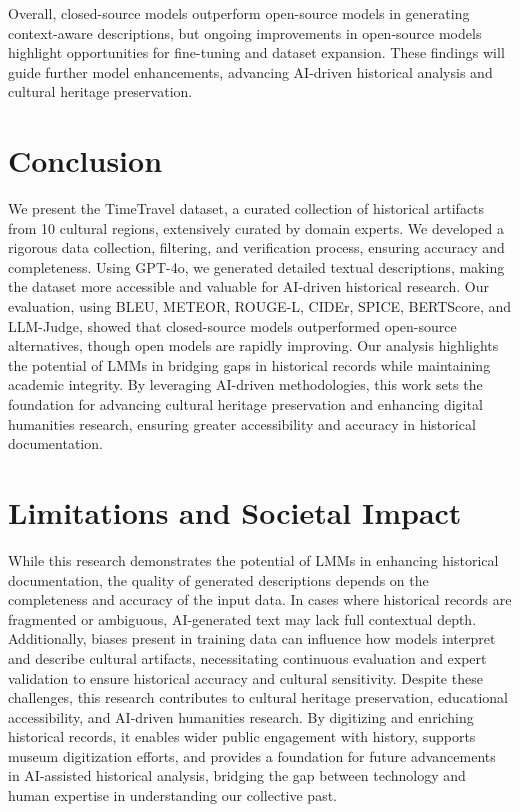 \documentclass[11pt]{article}
\begin{document}
Overall, closed-source models outperform open-source models in generating context-aware descriptions, but ongoing improvements in open-source models highlight opportunities for fine-tuning and dataset expansion. These findings will guide further model enhancements, advancing AI-driven historical analysis and cultural heritage preservation.

\section{Conclusion}
We present the TimeTravel dataset, a curated collection of historical artifacts from 10 cultural regions, extensively curated by domain experts. We developed a rigorous data collection, filtering, and verification process, ensuring accuracy and completeness. Using GPT-4o, we generated detailed textual descriptions, making the dataset more accessible and valuable for AI-driven historical research. Our evaluation, using BLEU, METEOR, ROUGE-L, CIDEr, SPICE, BERTScore, and LLM-Judge, showed that closed-source models outperformed open-source alternatives, though open models are rapidly improving. Our analysis highlights the potential of LMMs in bridging gaps in historical records while maintaining academic integrity. By leveraging AI-driven methodologies, this work sets the foundation for advancing cultural heritage preservation and enhancing digital humanities research, ensuring greater accessibility and accuracy in historical documentation.

\section{Limitations and Societal Impact}
While this research demonstrates the potential of LMMs in enhancing historical documentation, the quality of generated descriptions depends on the completeness and accuracy of the input data. In cases where historical records are fragmented or ambiguous, AI-generated text may lack full contextual depth. Additionally, biases present in training data can influence how models interpret and describe cultural artifacts, necessitating continuous evaluation and expert validation to ensure historical accuracy and cultural sensitivity. Despite these challenges, this research contributes to cultural heritage preservation, educational accessibility, and AI-driven humanities research. By digitizing and enriching historical records, it enables wider public engagement with history, supports museum digitization efforts, and provides a foundation for future advancements in AI-assisted historical analysis, bridging the gap between technology and human expertise in understanding our collective past.
\end{document}
